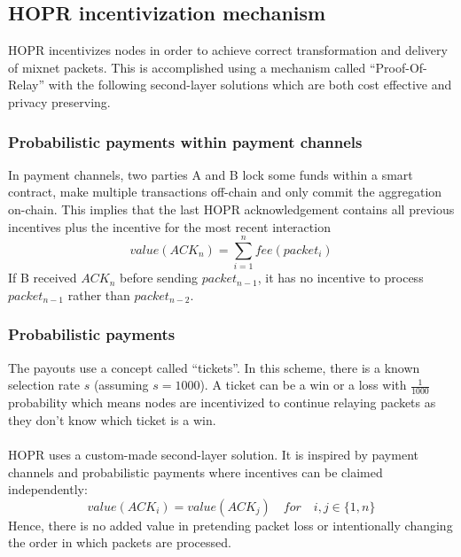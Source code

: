 \subsection{HOPR incentivization mechanism}
HOPR incentivizes nodes in order to achieve correct transformation and delivery of mixnet packets. 
This is accomplished using a mechanism called “Proof-Of-Relay” with the following second-layer solutions which are both cost effective and privacy preserving.

\subsubsection{Probabilistic payments within payment channels}
In payment channels, two parties A and B lock some funds within a smart contract, make multiple transactions off-chain and only commit the aggregation on-chain. 
This implies that the last HOPR acknowledgement contains all previous incentives plus the incentive for the most recent interaction 
   $$value(ACK_n) =\sum_{i=1}^nfee(packet_i)$$
If B received $ACK_n$ before sending $packet_{n-1}$, it has no incentive to process $packet_{n-1}$ rather than $packet_{n-2}$. 

\subsubsection*{Probabilistic payments}  
The payouts use a concept called “tickets”. In this scheme, there is a known selection rate $s$ (assuming $s=1000$).
A ticket can be a win or a loss with $\frac{1}{1000}$ probability which means nodes are incentivized to continue relaying packets as they don’t know which ticket is a win. 
\\~\\HOPR uses a custom-made second-layer solution. It is inspired by payment channels and probabilistic payments where incentives can be claimed independently: 
$$value ( ACK_i )=value ( ACK_j ) \quad for \quad i,j\in \{1,n\}$$
Hence, there is no added value in pretending packet loss or intentionally changing the order in which packets are processed. 
